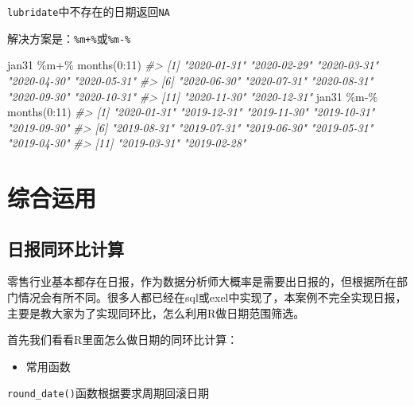 \documentclass[
]{book}
\newenvironment{Shaded}{\begin{snugshade}}{\end{snugshade}}
\newcommand{\CommentTok}[1]{\textcolor[rgb]{0.56,0.35,0.01}{\textit{#1}}}
\newcommand{\DecValTok}[1]{\textcolor[rgb]{0.00,0.00,0.81}{#1}}
\newcommand{\FunctionTok}[1]{\textcolor[rgb]{0.00,0.00,0.00}{#1}}
\newcommand{\NormalTok}[1]{#1}
\newcommand{\SpecialCharTok}[1]{\textcolor[rgb]{0.00,0.00,0.00}{#1}}
\providecommand{\tightlist}{%
  \setlength{\itemsep}{0pt}\setlength{\parskip}{0pt}}
\begin{document}
\texttt{lubridate}中不存在的日期返回\texttt{NA}

解决方案是：\texttt{\%m+\%}或\texttt{\%m-\%}

\begin{Shaded}
\begin{Highlighting}[]
\NormalTok{jan31 }\SpecialCharTok{\%m+\%} \FunctionTok{months}\NormalTok{(}\DecValTok{0}\SpecialCharTok{:}\DecValTok{11}\NormalTok{)}
\CommentTok{\#\textgreater{}  [1] "2020{-}01{-}31" "2020{-}02{-}29" "2020{-}03{-}31" "2020{-}04{-}30" "2020{-}05{-}31"}
\CommentTok{\#\textgreater{}  [6] "2020{-}06{-}30" "2020{-}07{-}31" "2020{-}08{-}31" "2020{-}09{-}30" "2020{-}10{-}31"}
\CommentTok{\#\textgreater{} [11] "2020{-}11{-}30" "2020{-}12{-}31"}
\NormalTok{jan31 }\SpecialCharTok{\%m{-}\%} \FunctionTok{months}\NormalTok{(}\DecValTok{0}\SpecialCharTok{:}\DecValTok{11}\NormalTok{)}
\CommentTok{\#\textgreater{}  [1] "2020{-}01{-}31" "2019{-}12{-}31" "2019{-}11{-}30" "2019{-}10{-}31" "2019{-}09{-}30"}
\CommentTok{\#\textgreater{}  [6] "2019{-}08{-}31" "2019{-}07{-}31" "2019{-}06{-}30" "2019{-}05{-}31" "2019{-}04{-}30"}
\CommentTok{\#\textgreater{} [11] "2019{-}03{-}31" "2019{-}02{-}28"}
\end{Highlighting}
\end{Shaded}

\hypertarget{datetime:application}{%
\section{综合运用}\label{datetime:application}}

\hypertarget{ux65e5ux62a5ux540cux73afux6bd4ux8ba1ux7b97}{%
\subsection{日报同环比计算}\label{ux65e5ux62a5ux540cux73afux6bd4ux8ba1ux7b97}}

零售行业基本都存在日报，作为数据分析师大概率是需要出日报的，但根据所在部门情况会有所不同。很多人都已经在sql或exel中实现了，本案例不完全实现日报，主要是教大家为了实现同环比，怎么利用R做日期范围筛选。

首先我们看看R里面怎么做日期的同环比计算：

\begin{itemize}
\tightlist
\item
  常用函数
\end{itemize}

\texttt{round\_date()}函数根据要求周期回滚日期
\end{document}
